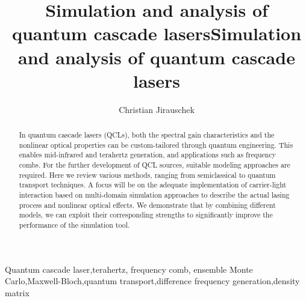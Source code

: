 \documentclass[a4paper]{spie}%
\title
{Simulation and analysis of quantum cascade lasers}
\author{Christian Jirauschek}
\affil
{Institute for Nanoelectronics, Technical University of Munich (TUM), Arcisstr. 21, D-80333 Munich, Germany}
\begin{document}
\title{Simulation and analysis of quantum cascade lasers}
\maketitle%

\begin{abstract}
In quantum cascade lasers (QCLs), both the spectral gain characteristics and
the nonlinear optical properties can be custom-tailored through quantum
engineering. This enables mid-infrared and terahertz generation, and
applications such as frequency combs. For the further development of QCL
sources, suitable modeling approaches are required. Here we review various
methods, ranging from semiclassical to quantum transport techniques. A focus
will be on the adequate implementation of carrier-light interaction based on multi-domain simulation approaches to
describe the actual lasing process and nonlinear optical effects. We
demonstrate that by combining different models, we can exploit their
corresponding strengths to significantly improve the performance of the
simulation tool.
\end{abstract}%

\keywords
{Quantum cascade laser,terahertz, frequency comb, ensemble Monte Carlo,Maxwell-Bloch,quantum transport,difference frequency generation,density matrix}%
\end{document}
